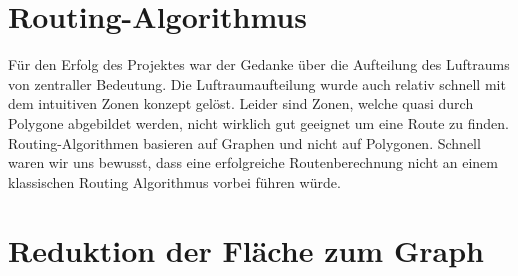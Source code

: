 \section{Routing-Algorithmus}
Für den Erfolg des Projektes war der Gedanke über die Aufteilung des Luftraums von zentraller Bedeutung. Die Luftraumaufteilung wurde auch relativ schnell mit dem intuitiven Zonen konzept gelöst. Leider sind Zonen, welche quasi durch Polygone abgebildet werden, nicht wirklich gut geeignet um eine Route zu finden. Routing-Algorithmen basieren auf Graphen und nicht auf Polygonen. Schnell waren wir uns bewusst, dass eine erfolgreiche Routenberechnung nicht an einem klassischen Routing Algorithmus vorbei führen würde.
\section{Reduktion der Fläche zum Graph}
